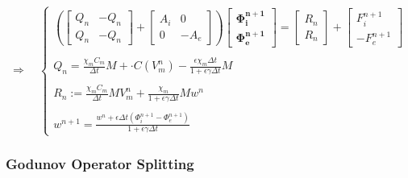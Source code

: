 \documentclass[a4paper]{article}
\begin{document}
\begin{equation}
\Rightarrow \quad
\begin{cases}
\left(
\begin{bmatrix} Q_n & -Q_n \\ Q_n & -Q_n \end{bmatrix} + 
\begin{bmatrix} A_i & 0 \\ 0 & -A_e\end{bmatrix}
\right)
\begin{bmatrix}
\bm{\Phi_i^{n+1}} \\ \bm{\Phi_e^{n+1}}
\end{bmatrix}
= \begin{bmatrix} R_n \\ R_n \end{bmatrix} + \begin{bmatrix} F_i^{n+1} \\  -F_e^{n+1}\end{bmatrix} \\ \\
Q_n = \frac{\displaystyle \chi_m C_m}{\displaystyle \Delta t}M +  \cdot C(V_m^n) - \frac{\displaystyle \epsilon\chi_m \Delta t}{\displaystyle 1 + \epsilon \gamma \Delta t}M \\ \\
R_n := \frac{\displaystyle \chi_mC_m}{\displaystyle \Delta t}MV_m^n + \frac{\displaystyle \chi_m}{\displaystyle 1+\epsilon\gamma\Delta t}M w^n \\ \\
w^{n+1} = \frac{\displaystyle w^n + \epsilon \Delta t (\Phi_i^{n+1}-\Phi_e^{n+1})}{\displaystyle 1+\epsilon \gamma \Delta t}
\end{cases}
\end{equation}


\vspace{5mm}
\subsubsection{Godunov Operator Splitting}
\end{document}

